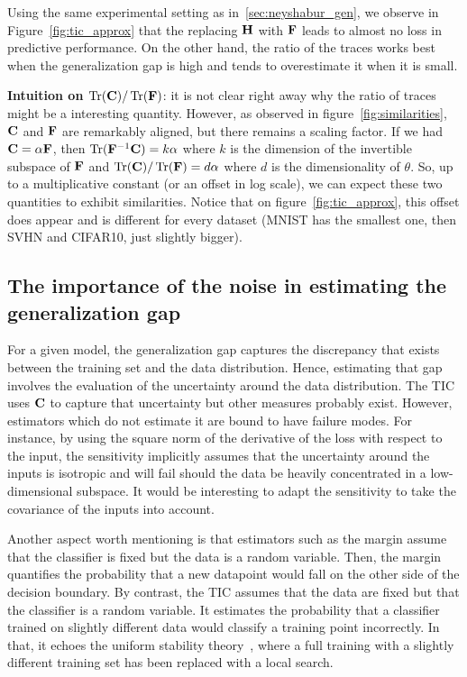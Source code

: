 Using the same experimental setting as in~\ref{sec:neyshabur_gen}, we observe in Figure~\ref{fig:tic_approx} that the replacing ${\mathbf{H}}$ with ${\mathbf{F}}$ leads to almost no loss in predictive performance. On the other hand, the ratio of the traces works best when the generalization gap is high and tends to overestimate it when it is small.

\textbf{Intuition on $\operatorname{Tr}({\mathbf{C}}) / \operatorname{Tr}({\mathbf{F}})$}: it is not clear right away why the ratio of traces might be a interesting quantity. However, as observed in figure~\ref{fig:similarities}, ${\mathbf{C}}$ and ${\mathbf{F}}$ are remarkably aligned, but there remains a scaling factor. If we had ${\mathbf{C}} = \alpha {\mathbf{F}}$, then $\operatorname{Tr}({\mathbf{F}}^{-1} {\mathbf{C}}) = k \alpha$ where $k$ is the dimension of the invertible subspace of ${\mathbf{F}}$ and $\operatorname{Tr}({\mathbf{C}}) / \operatorname{Tr}({\mathbf{F}}) = d \alpha$ where $d$ is the dimensionality of $\theta$. So, up to a multiplicative constant (or an offset in log scale), we can expect these two quantities to exhibit similarities.
Notice that on figure~\ref{fig:tic_approx}, this offset does appear and is different for every dataset (MNIST has the smallest one, then SVHN and CIFAR10, just slightly bigger).

\subsection{The importance of the noise in estimating the generalization gap}
For a given model, the generalization gap captures the discrepancy that exists between the training set and the data distribution. Hence, estimating that gap involves the evaluation of the uncertainty around the data distribution. The TIC uses ${\mathbf{C}}$ to capture that uncertainty but other measures probably exist. However, estimators which do not estimate it are bound to have failure modes. For instance, by using the square norm of the derivative of the loss with respect to the input, the sensitivity implicitly assumes that the uncertainty around the inputs is isotropic and will fail should the data be heavily concentrated in a low-dimensional subspace. It would be interesting to adapt the sensitivity to take the covariance of the inputs into account.

Another aspect worth mentioning is that estimators such as the margin assume that the classifier is fixed but the data is a random variable. Then, the margin quantifies the probability that a new datapoint would fall on the other side of the decision boundary. By contrast, the TIC assumes that the data are fixed but that the classifier is a random variable. It estimates the probability that a classifier trained on slightly different data would classify a training point incorrectly. In that, it echoes the uniform stability theory~\citep{bousquet2002stability}, where a full training with a slightly different training set has been replaced with a local search.








